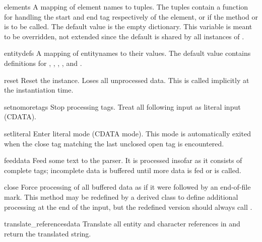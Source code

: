 \begin{memberdesc}{elements} 
A mapping of element names to tuples.  The tuples contain a function
for handling the start and end tag respectively of the element, or
 if the method  or
 is to be called.  The default value is the
empty dictionary.  This variable is meant to be overridden, not
extended since the default is shared by all instances of
.
\end{memberdesc}

\begin{memberdesc}{entitydefs}
A mapping of entitynames to their values.  The default value contains
definitions for , , , , 
and .
\end{memberdesc}

\begin{methoddesc}{reset}{}
Reset the instance.  Loses all unprocessed data.  This is called
implicitly at the instantiation time.
\end{methoddesc}

\begin{methoddesc}{setnomoretags}{}
Stop processing tags.  Treat all following input as literal input
(CDATA).
\end{methoddesc}

\begin{methoddesc}{setliteral}{}
Enter literal mode (CDATA mode).  This mode is automatically exited
when the close tag matching the last unclosed open tag is encountered.
\end{methoddesc}

\begin{methoddesc}{feed}{data}
Feed some text to the parser.  It is processed insofar as it consists
of complete tags; incomplete data is buffered until more data is
fed or  is called.
\end{methoddesc}

\begin{methoddesc}{close}{}
Force processing of all buffered data as if it were followed by an
end-of-file mark.  This method may be redefined by a derived class to
define additional processing at the end of the input, but the
redefined version should always call .
\end{methoddesc}

\begin{methoddesc}{translate_references}{data}
Translate all entity and character references in  and
return the translated string.
\end{methoddesc}


